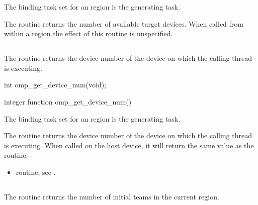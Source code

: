 \binding
The binding task set for an  region is the generating task.

\effect
The  routine returns the number of 
available target devices. When called from within a  
region the effect of this routine is unspecified.



\subsection{}
\label{subsec:omp_get_device_num}
\summary
The  routine returns the device number 
of the device on which the calling thread is executing.

\format
\begin{ccppspecific}
\begin{ompcFunction}
int omp_get_device_num(void);
\end{ompcFunction}
\end{ccppspecific}


\begin{fortranspecific}
\begin{ompfFunction}
integer function omp_get_device_num()
\end{ompfFunction}
\end{fortranspecific}

\binding
The binding task set for an  region is 
the generating task.

\effect
The  routine returns the device number of 
the device on which the calling thread is executing. When called on 
the host device, it will return the same value as the 
 routine.

\crossreferences
\begin{itemize}
\item {} routine, see
.
\end{itemize}



\subsection{}
\label{subsec:omp_get_num_teams}
\summary
The  routine returns the number of initial 
teams in the current  region.

